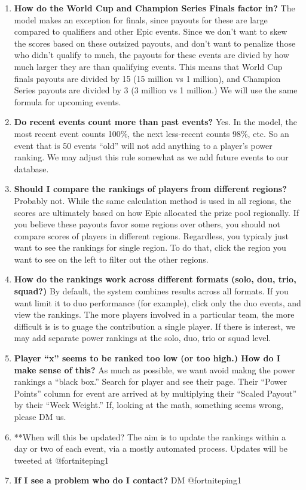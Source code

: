 \documentclass[]{article}
\begin{document}
\begin{enumerate}
\def\labelenumi{\arabic{enumi}.}
\setcounter{enumi}{3}
\item
  \textbf{How do the World Cup and Champion Series Finals factor in?}
  The model makes an exception for finals, since payouts for these are
  large compared to qualifiers and other Epic events. Since we don't
  want to skew the scores based on these outsized payouts, and don't
  want to penalize those who didn't qualify to much, the payouts for
  these events are divied by how much larger they are than qualifying
  events. This means that World Cup finals payouts are divided by 15 (15
  million vs 1 million), and Champion Series payouts are divided by 3 (3
  million vs 1 million.) We will use the same formula for upcoming
  events.
\item
  \textbf{Do recent events count more than past events?} Yes. In the
  model, the most recent event counts 100\%, the next less-recent counts
  98\%, etc. So an event that is 50 events ``old'' will not add anything
  to a player's power ranking. We may adjust this rule somewhat as we
  add future events to our database.
\item
  \textbf{Should I compare the rankings of players from different
  regions?} Probably not. While the same calculation method is used in
  all regions, the scores are ultimately based on how Epic allocated the
  prize pool regionally. If you believe these payouts favor some regions
  over others, you should not compare scores of players in different
  regions. Regardless, you typicaly just want to see the rankings for
  single region. To do that, click the region you want to see on the
  left to filter out the other regions.
\item
  \textbf{How do the rankings work across different formats (solo, dou,
  trio, squad?)} By default, the system combines results across all
  formats. If you want limit it to duo performance (for example), click
  only the duo events, and view the rankings. The more players involved
  in a particular team, the more difficult is is to guage the
  contribution a single player. If there is interest, we may add
  separate power rankings at the solo, duo, trio or squad level.
\item
  \textbf{Player ``x'' seems to be ranked too low (or too high.) How do
  I make sense of this?} As much as possible, we want avoid makng the
  power rankings a ``black box.'' Search for player and see their page.
  Their ``Power Points'' column for event are arrived at by multiplying
  their ``Scaled Payout'' by their ``Week Weight.'' If, looking at the
  math, something seems wrong, please DM us.\\
\item
  **When will this be updated? The aim is to update the rankings within
  a day or two of each event, via a mostly automated process. Updates
  will be tweeted at @fortniteping1
\item
  \textbf{If I see a problem who do I contact?} DM @fortniteping1
\end{enumerate}
\end{document}
